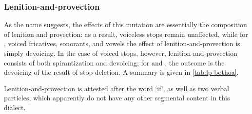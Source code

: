\subsubsection{Lenition-and-provection}
\label{sec:lenition-provection}

As the name suggests, the effects of this mutation are essentially the composition of lenition and provection: as a result, voiceless stops remain unaffected, while for \ipa{[d(ʒ)]}, voiced fricatives, sonorants, and vowels the effect of lenition-and-provection is simply devoicing. In the case of voiced stops, however, lenition-and-provection consists of both spirantization and devoicing; for \ipa{[ɡw]} and \ipa{[dʒɥ]}, the outcome is the devoicing of the result of stop deletion. A summary is given in \cref{tab:lp-bothoa}.\begin{table}[tbp]
  \centering
{}
  \caption{Lenition-and-provection in Bothoa Breton}
  \label{tab:lp-bothoa}
\end{table}

Lenition-and-provection is attested after the word \ipa{[ma]} `if', as well as two verbal particles, which apparently do not have any other segmental content in this dialect.

